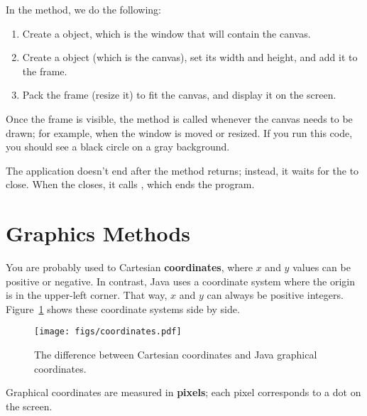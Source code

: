 
In the  method, we do the following:

\begin{enumerate}

\item Create a  object, which is the window that will contain the canvas.

\item Create a  object (which is the canvas), set its width and height, and add it to the frame.

\item Pack the frame (resize it) to fit the canvas, and display it on the screen.
\end{enumerate}


Once the frame is visible, the  method is called whenever the canvas needs to be drawn; for example, when the window is moved or resized.
If you run this code, you should see a black circle on a gray background.

The application doesn't end after the  method returns; instead, it waits for the  to close.
When the  closes, it calls , which ends the program.

\section{Graphics Methods}
\label{graphics_graphics-methods}


You are probably used to Cartesian {\bf coordinates}, where $x$ and $y$ values can be positive or negative.
In contrast, Java uses a coordinate system where the origin is in the upper-left corner.
That way, $x$ and $y$ can always be positive integers.
Figure~\ref{fig.coordinates} shows these coordinate systems side by side.

\begin{figure}[!ht]
\begin{center}
\texttt{[image: figs/coordinates.pdf]}
\caption{The difference between Cartesian coordinates and Java graphical coordinates.}
\label{fig.coordinates}
\end{center}
\end{figure}


Graphical coordinates are measured in {\bf pixels}; each pixel corresponds to a dot on the screen.

